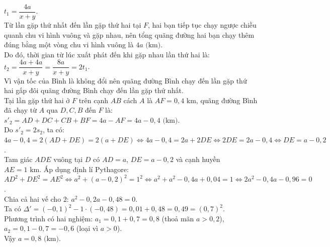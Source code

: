 \begin{bt}
{\begin{enumerate}[a)]
	$t_1 = \dfrac{4a}{x + y}$.\\
	Từ lần gặp thứ nhất đến lần gặp thứ hai tại $F$, hai bạn tiếp tục chạy ngược chiều quanh chu vi hình vuông và gặp nhau, nên tổng quãng đường hai bạn chạy thêm đúng bằng một vòng chu vi hình vuông là $4a\text{ (km)}$.\\
	Do đó, thời gian từ lúc xuất phát đến khi gặp nhau lần thứ hai là:
	$t_2 = \dfrac{4a + 4a}{x + y} = \dfrac{8a}{x + y} = 2t_1$.\\
	Vì vận tốc của Bình là không đổi nên quãng đường Bình chạy đến lần gặp thứ hai gấp đôi quãng đường Bình chạy đến lần gặp thứ nhất.\\
	Tại lần gặp thứ hai ở $F$ trên cạnh $AB$ cách $A$ là $AF = 0{,}4\text{ km}$, quãng đường Bình đã chạy từ $A$ qua $D, C, B$ đến $F$ là:
	$s'_2 = AD + DC + CB + BF = 4a - AF = 4a - 0{,}4\text{ (km)}$.\\
	Do $s'_2 = 2s_2$, ta có:
	$4a - 0{,}4 = 2(AD + DE) = 2(a + DE) \Leftrightarrow 4a - 0{,}4 = 2a + 2DE \Leftrightarrow 2DE = 2a - 0{,}4 \Leftrightarrow DE = a - 0{,}2$.\\
	Tam giác $ADE$ vuông tại $D$ có $AD = a$, $DE = a - 0{,}2$ và cạnh huyền $AE = 1\text{ km}$. Áp dụng định lí Pythagore:
	$AD^2 + DE^2 = AE^2 \Leftrightarrow a^2 + (a - 0{,}2)^2 = 1^2 \Leftrightarrow a^2 + a^2 - 0{,}4a + 0{,}04 = 1 \Leftrightarrow 2a^2 - 0{,}4a - 0{,}96 = 0$.\\
	Chia cả hai vế cho $2$: $a^2 - 0{,}2a - 0{,}48 = 0$.\\
	Ta có $\Delta' = (-0{,}1)^2 - 1\cdot(-0{,}48) = 0{,}01 + 0{,}48 = 0{,}49 = (0{,}7)^2$.\\
	Phương trình có hai nghiệm:
	$a_1 = 0{,}1 + 0{,}7 = 0{,}8$ (thoả mãn $a > 0{,}2$),\\
	$a_2 = 0{,}1 - 0{,}7 = -0{,}6$ (loại vì $a > 0$).\\
	Vậy $a = 0{,}8\text{ (km)}$.
\end{enumerate}
}
\end{bt}
